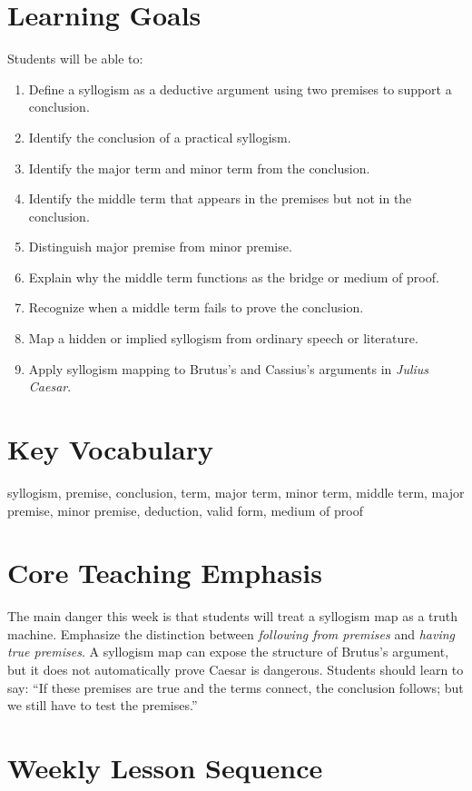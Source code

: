 \documentclass[12pt]{article}
\begin{document}
\section*{Learning Goals}
Students will be able to:
\begin{enumerate}[leftmargin=*]
\item Define a syllogism as a deductive argument using two premises to support a conclusion.
\item Identify the conclusion of a practical syllogism.
\item Identify the major term and minor term from the conclusion.
\item Identify the middle term that appears in the premises but not in the conclusion.
\item Distinguish major premise from minor premise.
\item Explain why the middle term functions as the bridge or medium of proof.
\item Recognize when a middle term fails to prove the conclusion.
\item Map a hidden or implied syllogism from ordinary speech or literature.
\item Apply syllogism mapping to Brutus's and Cassius's arguments in \textit{Julius Caesar}.
\end{enumerate}

\section*{Key Vocabulary}
syllogism, premise, conclusion, term, major term, minor term, middle term, major premise, minor premise, deduction, valid form, medium of proof

\section*{Core Teaching Emphasis}
The main danger this week is that students will treat a syllogism map as a truth machine. Emphasize the distinction between \textit{following from premises} and \textit{having true premises}. A syllogism map can expose the structure of Brutus's argument, but it does not automatically prove Caesar is dangerous. Students should learn to say: ``If these premises are true and the terms connect, the conclusion follows; but we still have to test the premises.''

\section*{Weekly Lesson Sequence}
\end{document}
